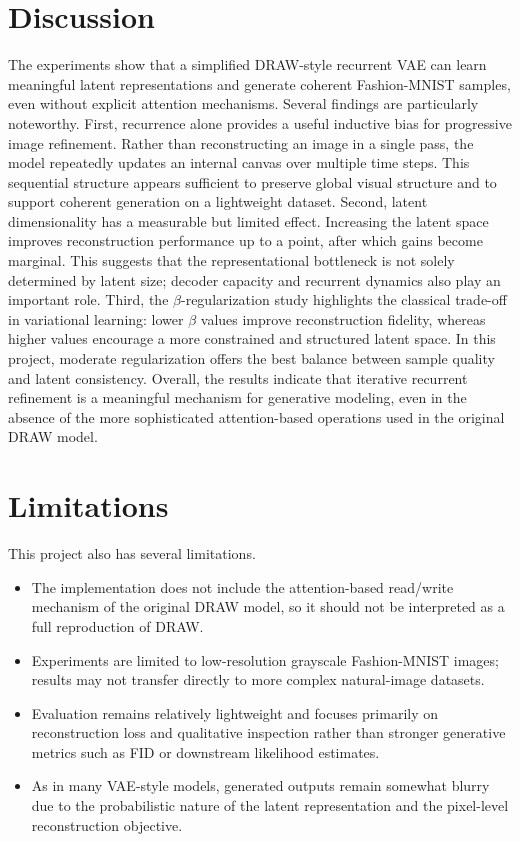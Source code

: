 \documentclass[11pt,a4paper]{article}
\begin{document}
\section{Discussion}
The experiments show that a simplified DRAW-style recurrent VAE can learn meaningful latent representations and generate coherent Fashion-MNIST samples, even without explicit attention mechanisms. Several findings are particularly noteworthy.
First, recurrence alone provides a useful inductive bias for progressive image refinement. Rather than reconstructing an image in a single pass, the model repeatedly updates an internal canvas over multiple time steps. This sequential structure appears sufficient to preserve global visual structure and to support coherent generation on a lightweight dataset.
Second, latent dimensionality has a measurable but limited effect. Increasing the latent space improves reconstruction performance up to a point, after which gains become marginal. This suggests that the representational bottleneck is not solely determined by latent size; decoder capacity and recurrent dynamics also play an important role.
Third, the $\beta$-regularization study highlights the classical trade-off in variational learning: lower $\beta$ values improve reconstruction fidelity, whereas higher values encourage a more constrained and structured latent space. In this project, moderate regularization offers the best balance between sample quality and latent consistency.
Overall, the results indicate that iterative recurrent refinement is a meaningful mechanism for generative modeling, even in the absence of the more sophisticated attention-based operations used in the original DRAW model.
\section{Limitations}
This project also has several limitations.
\begin{itemize}
    \item The implementation does not include the attention-based read/write mechanism of the original DRAW model, so it should not be interpreted as a full reproduction of DRAW.
    \item Experiments are limited to low-resolution grayscale Fashion-MNIST images; results may not transfer directly to more complex natural-image datasets.
    \item Evaluation remains relatively lightweight and focuses primarily on reconstruction loss and qualitative inspection rather than stronger generative metrics such as FID or downstream likelihood estimates.
    \item As in many VAE-style models, generated outputs remain somewhat blurry due to the probabilistic nature of the latent representation and the pixel-level reconstruction objective.
\end{itemize}
\end{document}
